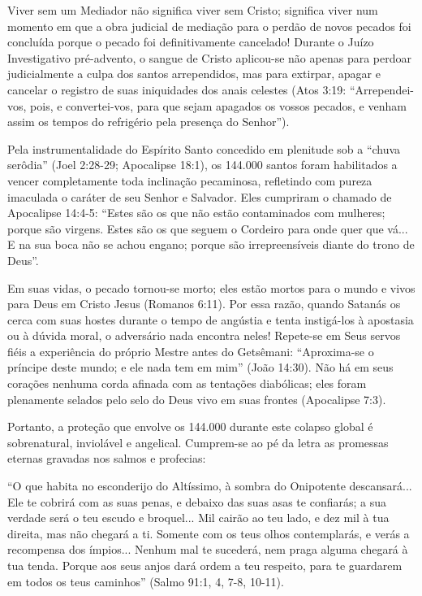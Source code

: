 \documentclass[11pt,a4paper,openany]{book}
\begin{document}
Viver sem um Mediador não significa viver sem Cristo; significa viver num momento em que a obra judicial de mediação para o perdão de novos pecados foi concluída porque o pecado foi definitivamente cancelado! Durante o Juízo Investigativo pré-advento, o sangue de Cristo aplicou-se não apenas para perdoar judicialmente a culpa dos santos arrependidos, mas para extirpar, apagar e cancelar o registro de suas iniquidades dos anais celestes (Atos 3:19: ``Arrependei-vos, pois, e convertei-vos, para que sejam apagados os vossos pecados, e venham assim os tempos do refrigério pela presença do Senhor'').

Pela instrumentalidade do Espírito Santo concedido em plenitude sob a ``chuva serôdia'' (Joel 2:28-29; Apocalipse 18:1), os 144.000 santos foram habilitados a vencer completamente toda inclinação pecaminosa, refletindo com pureza imaculada o caráter de seu Senhor e Salvador. Eles cumpriram o chamado de Apocalipse 14:4-5: ``Estes são os que não estão contaminados com mulheres; porque são virgens. Estes são os que seguem o Cordeiro para onde quer que vá... E na sua boca não se achou engano; porque são irrepreensíveis diante do trono de Deus''.

Em suas vidas, o pecado tornou-se morto; eles estão mortos para o mundo e vivos para Deus em Cristo Jesus (Romanos 6:11). Por essa razão, quando Satanás os cerca com suas hostes durante o tempo de angústia e tenta instigá-los à apostasia ou à dúvida moral, o adversário nada encontra neles! Repete-se em Seus servos fiéis a experiência do próprio Mestre antes do Getsêmani: ``Aproxima-se o príncipe deste mundo; e ele nada tem em mim'' (João 14:30). Não há em seus corações nenhuma corda afinada com as tentações diabólicas; eles foram plenamente selados pelo selo do Deus vivo em suas frontes (Apocalipse 7:3).

Portanto, a proteção que envolve os 144.000 durante este colapso global é sobrenatural, inviolável e angelical. Cumprem-se ao pé da letra as promessas eternas gravadas nos salmos e profecias:

``O que habita no esconderijo do Altíssimo, à sombra do Onipotente descansará... Ele te cobrirá com as suas penas, e debaixo das suas asas te confiarás; a sua verdade será o teu escudo e broquel... Mil cairão ao teu lado, e dez mil à tua direita, mas não chegará a ti. Somente com os teus olhos contemplarás, e verás a recompensa dos ímpios... Nenhum mal te sucederá, nem praga alguma chegará à tua tenda. Porque aos seus anjos dará ordem a teu respeito, para te guardarem em todos os teus caminhos'' (Salmo 91:1, 4, 7-8, 10-11).
\end{document}
